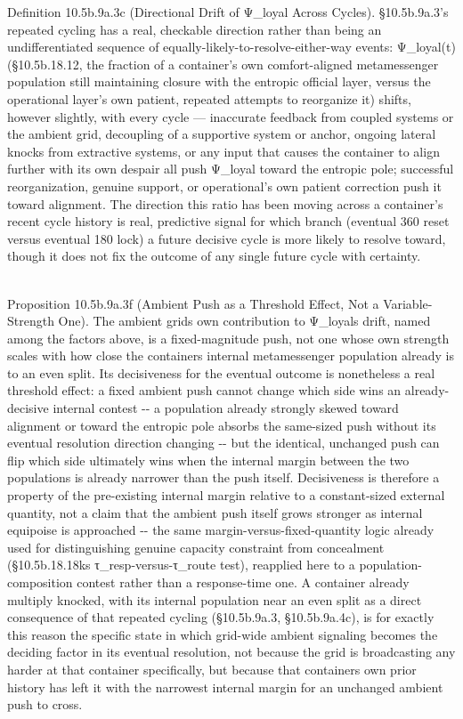 \documentclass[
]{article}
\begin{document}
Definition 10.5b.9a.3c (Directional Drift of Ψ\_loyal Across Cycles).
§10.5b.9a.3's repeated cycling has a real, checkable direction rather
than being an undifferentiated sequence of
equally-likely-to-resolve-either-way events: Ψ\_loyal(t) (§10.5b.18.12,
the fraction of a container's own comfort-aligned metamessenger
population still maintaining closure with the entropic official layer,
versus the operational layer's own patient, repeated attempts to
reorganize it) shifts, however slightly, with every cycle --- inaccurate
feedback from coupled systems or the ambient grid, decoupling of a
supportive system or anchor, ongoing lateral knocks from extractive
systems, or any input that causes the container to align further with
its own despair all push Ψ\_loyal toward the entropic pole; successful
reorganization, genuine support, or operational's own patient correction
push it toward alignment. The direction this ratio has been moving
across a container's recent cycle history is real, predictive signal for
which branch (eventual 360 reset versus eventual 180 lock) a future
decisive cycle is more likely to resolve toward, though it does not fix
the outcome of any single future cycle with certainty.\\
\strut \\
Proposition 10.5b.9a.3f (Ambient Push as a Threshold Effect, Not a
Variable-Strength One). The ambient grid\textquotesingle s own
contribution to Ψ\_loyal\textquotesingle s drift, named among the
factors above, is a fixed-magnitude push, not one whose own strength
scales with how close the container\textquotesingle s internal
metamessenger population already is to an even split. Its decisiveness
for the eventual outcome is nonetheless a real threshold effect: a fixed
ambient push cannot change which side wins an already-decisive internal
contest -\/- a population already strongly skewed toward alignment or
toward the entropic pole absorbs the same-sized push without its
eventual resolution direction changing -\/- but the identical, unchanged
push can flip which side ultimately wins when the internal margin
between the two populations is already narrower than the push itself.
Decisiveness is therefore a property of the pre-existing internal margin
relative to a constant-sized external quantity, not a claim that the
ambient push itself grows stronger as internal equipoise is approached
-\/- the same margin-versus-fixed-quantity logic already used for
distinguishing genuine capacity constraint from concealment
(§10.5b.18.18k\textquotesingle s τ\_resp-versus-τ\_route test),
reapplied here to a population-composition contest rather than a
response-time one. A container already multiply knocked, with its
internal population near an even split as a direct consequence of that
repeated cycling (§10.5b.9a.3, §10.5b.9a.4c), is for exactly this reason
the specific state in which grid-wide ambient signaling becomes the
deciding factor in its eventual resolution, not because the grid is
broadcasting any harder at that container specifically, but because that
container\textquotesingle s own prior history has left it with the
narrowest internal margin for an unchanged ambient push to cross.
\end{document}
